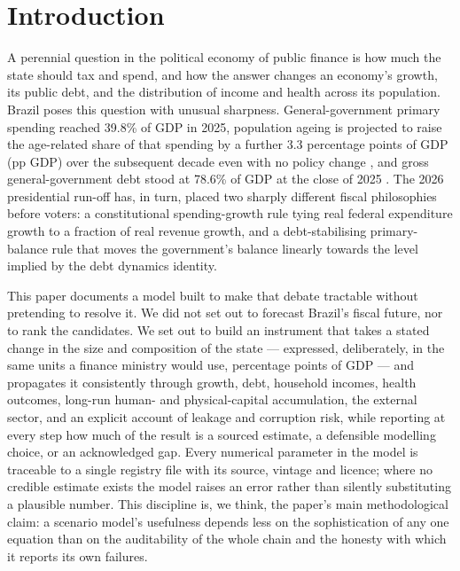 \documentclass[11pt,a4paper]{article}
\begin{document}
\vspace{0.3cm}

\section{Introduction}

A perennial question in the political economy of public finance is how much the state should tax and spend, and how the answer changes an economy's growth, its public debt, and the distribution of income and health across its population. Brazil poses this question with unusual sharpness. General-government primary spending reached 39.8\% of GDP in 2025, population ageing is projected to raise the age-related share of that spending by a further 3.3 percentage points of GDP (pp GDP) over the subsequent decade even with no policy change \citep{ibge2024,tesouro2025}, and gross general-government debt stood at 78.6\% of GDP at the close of 2025 \citep{bcbsgs}. The 2026 presidential run-off has, in turn, placed two sharply different fiscal philosophies before voters: a constitutional spending-growth rule tying real federal expenditure growth to a fraction of real revenue growth, and a debt-stabilising primary-balance rule that moves the government's balance linearly towards the level implied by the debt dynamics identity.

This paper documents a model built to make that debate tractable without pretending to resolve it. We did not set out to forecast Brazil's fiscal future, nor to rank the candidates. We set out to build an instrument that takes a stated change in the size and composition of the state --- expressed, deliberately, in the same units a finance ministry would use, percentage points of GDP --- and propagates it consistently through growth, debt, household incomes, health outcomes, long-run human- and physical-capital accumulation, the external sector, and an explicit account of leakage and corruption risk, while reporting at every step how much of the result is a sourced estimate, a defensible modelling choice, or an acknowledged gap. Every numerical parameter in the model is traceable to a single registry file with its source, vintage and licence; where no credible estimate exists the model raises an error rather than silently substituting a plausible number. This discipline is, we think, the paper's main methodological claim: a scenario model's usefulness depends less on the sophistication of any one equation than on the auditability of the whole chain and the honesty with which it reports its own failures.
\end{document}
